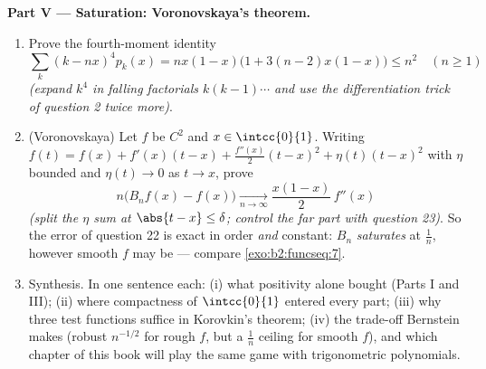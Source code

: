 \begin{problem}
\medskip
\noindent\textbf{Part V --- Saturation: Voronovskaya's
theorem.}
\begin{enumerate}[resume]
  \item Prove the fourth-moment identity
        \[
        \sum_k (k - nx)^4 p_k(x)
        = nx(1-x)\bigl(1 + 3(n-2)x(1-x)\bigr) \leq n^2
        \quad (n \geq 1)
        \]
        \emph{(expand $k^4$ in falling factorials $k(k-1)\cdots$
        and use the differentiation trick of question 2 twice
        more)}.
  \item (Voronovskaya) Let $f$ be $C^2$ and $x \in
        \intcc{0}{1}$. Writing $f(t) = f(x) + f'(x)(t-x) +
        \frac{f''(x)}2(t-x)^2 + \eta(t)(t-x)^2$ with $\eta$
        bounded and $\eta(t) \to 0$ as $t \to x$, prove
        \[
        n\bigl(B_nf(x) - f(x)\bigr)
        \xrightarrow[n\to\infty]{}
        \frac{x(1-x)}{2}\,f''(x)
        \]
        \emph{(split the $\eta$ sum at $\abs{t - x} \leq
        \delta$; control the far part with question 23)}. So
        the error of question 22 is exact in order \emph{and}
        constant: $B_n$ \emph{saturates} at $\frac1n$, however
        smooth $f$ may be --- compare
        \cref{exo:b2:funcseq:7}.
  \item Synthesis. In one sentence each: (i) what positivity
        alone bought (Parts I and III); (ii) where compactness
        of $\intcc{0}{1}$ entered every part; (iii) why three
        test functions suffice in Korovkin's theorem; (iv) the
        trade-off Bernstein makes (robust $n^{-1/2}$ for rough
        $f$, but a $\frac1n$ ceiling for smooth $f$), and which
        chapter of this book will play the same game with
        trigonometric polynomials.
\end{enumerate}
\end{problem}
